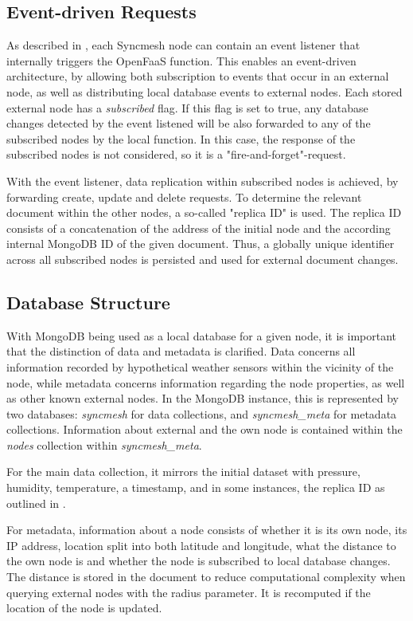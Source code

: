 \documentclass[conference]{IEEEtran}
\begin{document}
\subsection{Event-driven Requests}\label{sec:event-driven}
As described in , each Syncmesh node can contain an event listener that internally triggers the OpenFaaS function. This enables an event-driven architecture, by allowing both subscription to events that occur in an external node, as well as distributing local database events to external nodes. Each stored external node has a \textit{subscribed} flag. If this flag is set to true, any database changes detected by the event listened will be also forwarded to any of the subscribed nodes by the local function. In this case, the response of the subscribed nodes is not considered, so it is a "fire-and-forget"-request.

With the event listener, data replication within subscribed nodes is achieved, by forwarding create, update and delete requests. To determine the relevant document within the other nodes, a so-called "replica ID" is used. The replica ID consists of a concatenation of the address of the initial node and the according internal MongoDB ID of the given document. Thus, a globally unique identifier across all subscribed nodes is persisted and used for external document changes.

\subsection{Database Structure}\label{sec:database-structure}
With MongoDB being used as a local database for a given node, it is important that the distinction of data and metadata is clarified. Data concerns all information recorded by hypothetical weather sensors within the vicinity of the node, while metadata concerns information regarding the node properties, as well as other known external nodes. In the MongoDB instance, this is represented by two databases: \textit{syncmesh} for data collections, and \textit{syncmesh\_meta} for metadata collections. Information about external and the own node is contained within the \textit{nodes} collection within \textit{syncmesh\_meta}. 

For the main data collection, it mirrors the initial dataset with pressure, humidity, temperature, a timestamp, and in some instances, the replica ID as outlined in .

For metadata, information about a node consists of whether it is its own node, its IP address, location split into both latitude and longitude, what the distance to the own node is and whether the node is subscribed to local database changes. The distance is stored in the document to reduce computational complexity when querying external nodes with the radius parameter. It is recomputed if the location of the node is updated.
\end{document}
